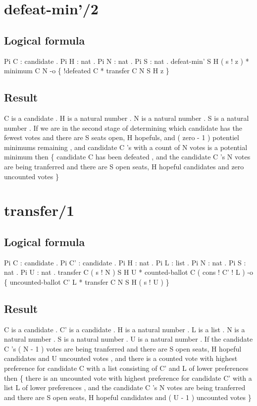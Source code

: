 \section{defeat-min'/2}
\subsection{Logical formula}
\begin{texto2}
	Pi C : candidate . Pi H : nat . Pi N : nat . Pi S : nat . defeat-min' S H ( s ! z ) * minimum C N -o \{ !defeated C * transfer C N S H z \}
\end{texto2}

\subsection{Result}
\begin{texto2}
	C is a candidate . H is a natural number . N is a natural number . S is a natural number . If we are in the second stage of determining which candidate has the fewest votes and there are S seats open, H hopefuls, and ( zero - 1 ) potentiel minimums remaining , and candidate C 's with a count of N votes is a potential minimum then \{ candidate C has been defeated , and the candidate C 's N votes are being tranferred and there are S open seats, H hopeful candidates and zero uncounted votes \}
\end{texto2}

\section{transfer/1}
\subsection{Logical formula}
\begin{texto2}
	Pi C : candidate . Pi C' : candidate . Pi H : nat . Pi L : list . Pi N : nat . Pi S : nat . Pi U : nat . transfer C ( s ! N ) S H U * counted-ballot C ( cons ! C' ! L ) -o \{ uncounted-ballot C' L * transfer C N S H ( s ! U ) \}
\end{texto2}

\subsection{Result}
\begin{texto2}
	C is a candidate . C' is a candidate . H is a natural number . L is a list . N is a natural number . S is a natural number . U is a natural number . If the candidate C 's ( N - 1 ) votes are being tranferred and there are S open seats, H hopeful candidates and U uncounted votes , and there is a counted vote with highest preference for candidate C with a list consisting of C' and L of lower preferences then \{ there is an uncounted vote with highest preference for candidate C' with a list L of lower preferences , and the candidate C 's N votes are being tranferred and there are S open seats, H hopeful candidates and ( U - 1 ) uncounted votes \}
\end{texto2}

